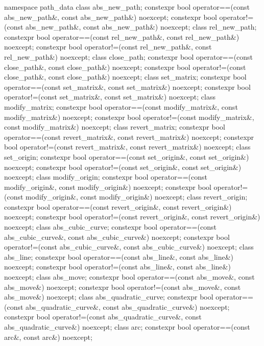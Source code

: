 \begin{codeblock}
{{{{  namespace path_data {
    class abs_new_path;
    constexpr bool operator==(const abs_new_path&, const abs_new_path&) 
      noexcept;
    constexpr bool operator!=(const abs_new_path&, const abs_new_path&) 
      noexcept;
    class rel_new_path;
    constexpr bool operator==(const rel_new_path&, const rel_new_path&) 
      noexcept;
    constexpr bool operator!=(const rel_new_path&, const rel_new_path&) 
      noexcept;
    class close_path;
    constexpr bool operator==(const close_path&, const close_path&) noexcept;
    constexpr bool operator!=(const close_path&, const close_path&) noexcept;
    class set_matrix;
    constexpr bool operator==(const set_matrix&, const set_matrix&) noexcept;
    constexpr bool operator!=(const set_matrix&, const set_matrix&) noexcept;
    class modify_matrix;
    constexpr bool operator==(const modify_matrix&, const modify_matrix&) 
      noexcept;
    constexpr bool operator!=(const modify_matrix&, const modify_matrix&) 
      noexcept;
    class revert_matrix;
    constexpr bool operator==(const revert_matrix&, const revert_matrix&) 
      noexcept;
    constexpr bool operator!=(const revert_matrix&, const revert_matrix&) 
      noexcept;
    class set_origin;
    constexpr bool operator==(const set_origin&, const set_origin&) noexcept;
    constexpr bool operator!=(const set_origin&, const set_origin&) noexcept;
    class modify_origin;
    constexpr bool operator==(const modify_origin&, const modify_origin&) 
      noexcept;
    constexpr bool operator!=(const modify_origin&, const modify_origin&) 
      noexcept;
    class revert_origin;
    constexpr bool operator==(const revert_origin&, const revert_origin&) 
      noexcept;
    constexpr bool operator!=(const revert_origin&, const revert_origin&) 
      noexcept;
    class abs_cubic_curve;
    constexpr bool operator==(const abs_cubic_curve&, const abs_cubic_curve&) 
      noexcept;
    constexpr bool operator!=(const abs_cubic_curve&, const abs_cubic_curve&) 
      noexcept;
    class abs_line;
    constexpr bool operator==(const abs_line&, const abs_line&) noexcept;
    constexpr bool operator!=(const abs_line&, const abs_line&) noexcept;
    class abs_move;
    constexpr bool operator==(const abs_move&, const abs_move&) noexcept;
    constexpr bool operator!=(const abs_move&, const abs_move&) noexcept;
    class abs_quadratic_curve;
    constexpr bool operator==(const abs_quadratic_curve&,
      const abs_quadratic_curve&) noexcept;
    constexpr bool operator!=(const abs_quadratic_curve&,
      const abs_quadratic_curve&) noexcept;
    class arc;
    constexpr bool operator==(const arc&, const arc&) noexcept;
}}}}}
\end{codeblock}
